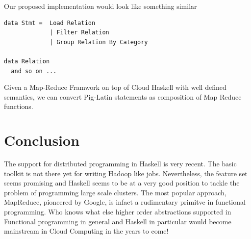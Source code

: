 \documentclass[twoside]{article}
\begin{document}
Our proposed implementation would look like something similar 

\begin{lstlisting}
data Stmt =  Load Relation
             | Filter Relation
             | Group Relation By Category

data Relation 
  and so on ...   

\end{lstlisting}

Given a Map-Reduce Framwork on top of Cloud Haskell with well defined
semantics, we can convert Pig-Latin statements as composition of Map
Reduce functions.

\section{Conclusion}
\label{sec:conclusion}

The support for distributed programming in Haskell is very recent. The
basic toolkit is not there yet for writing Hadoop like jobs.
Nevertheless, the feature set seems promising and Haskell seems to be
at a very good position to tackle the problem of programming large
scale clusters. The most popular approach, MapReduce, pioneered by
Google, is infact a rudimentary primitve in functional programming.
Who knows what else higher order abstractions supported in Functional
programming in general and Haskell in particular would become
mainstream in Cloud Computing in the years to come!



\end{document}
